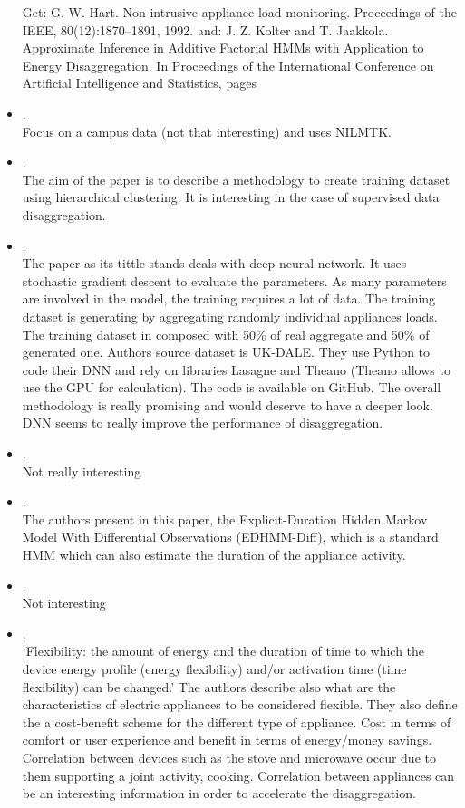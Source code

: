 \begin{itemize}
	 Get: G. W. Hart. Non-intrusive appliance load monitoring. Proceedings of the IEEE, 80(12):1870–1891, 1992.
	 and: J. Z. Kolter and T. Jaakkola. Approximate Inference in Additive Factorial HMMs with Application to Energy Disaggregation. In Proceedings of the International Conference on Artificial Intelligence and Statistics, pages
	\item {}.\\
	 Focus on a campus data (not that interesting) and uses NILMTK.
	\item {}.\\
	 The aim of the paper is to describe a methodology to create training dataset using hierarchical clustering. It is interesting in the case of supervised data disaggregation.
	\item {}.\\
	 The paper as its tittle stands deals with deep neural network. It uses stochastic gradient descent to evaluate the parameters. As many parameters are involved in the model, the training requires a lot of data. The training dataset is generating by aggregating randomly individual appliances loads. The training dataset in composed with 50\% of real aggregate and 50\% of generated one. Authors source dataset is UK-DALE\@. They use Python to code their DNN and rely on libraries Lasagne and Theano (Theano allows to use the GPU for calculation). The code is available on GitHub. The overall methodology is really promising and would deserve to have a deeper look. DNN seems to really improve the performance of disaggregation.
	\item {}.\\
	 Not really interesting
	\item {}.\\
	 The authors present in this paper, the Explicit-Duration Hidden Markov Model With Differential Observations (EDHMM-Diff), which is a standard HMM which can also estimate the duration of the appliance activity.
	\item {}.\\
	 Not interesting
	\item {}.\\
	 `Flexibility: the amount of energy and the duration of time to which the device energy profile (energy flexibility) and/or activation time (time flexibility) can be changed.' The authors describe also what are the characteristics of electric appliances to be considered flexible. They also define the a cost-benefit scheme for the different type of appliance. Cost in terms of comfort or user experience and benefit in terms of energy/money savings. Correlation between devices such as the stove and microwave occur due to them supporting a joint activity, cooking. Correlation between appliances can be an interesting information in order to accelerate the disaggregation.

\end{itemize}

